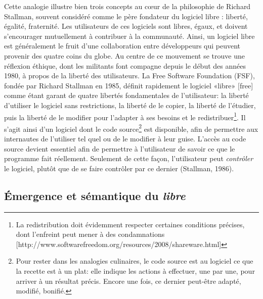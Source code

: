 \documentclass[
  letterpaper,
  DIV=11,
  numbers=noendperiod]{scrreprt}
\begin{document}
Cette analogie illustre bien trois concepts au cœur de la philosophie de
Richard Stallman, souvent considéré comme le père fondateur du logiciel
libre : liberté, égalité, fraternité. Les utilisateurs de ces logiciels
sont libres, égaux, et doivent s'encourager mutuellement à contribuer à
la communauté. Ainsi, un logiciel libre est généralement le fruit d'une
collaboration entre développeurs qui peuvent provenir des quatre coins
du globe. Au centre de ce mouvement se trouve une réflexion éthique,
dont les militants font compagne depuis le début des années 1980, à
propos de la liberté des utilisateurs. La Free Software Foundation
(FSF), fondée par Richard Stallman en 1985, définit rapidement le
logiciel «libre» {[}free{]} comme étant garant de quatre libertés
fondamentales de l'utilisateur: la liberté d'utiliser le logiciel sans
restrictions, la liberté de le copier, la liberté de l'étudier, puis la
liberté de le modifier pour l'adapter à ses besoins et le
redistribuer\footnote{La redistribution doit évidemment respecter
  certaines conditions précises, dont l'enfreint peut mener à des
  condamnations
  {[}http://www.softwarefreedom.org/resources/2008/shareware.html{]}}.
Il s'agit ainsi d'un logiciel dont le code source\footnote{Pour rester
  dans les analogies culinaires, le code source est au logiciel ce que
  la recette est à un plat: elle indique les actions à effectuer, une
  par une, pour arriver à un résultat précis. Encore une fois, ce
  dernier peut-être adapté, modifié, bonifié.} est disponible, afin de
permettre aux internautes de l'utiliser tel quel ou de le modifier à
leur guise. L'accès au code source devient essentiel afin de permettre à
l'utilisateur de savoir ce que le programme fait réellement. Seulement
de cette façon, l'utilisateur peut \emph{contrôler} le logiciel, plutôt
que de se faire contrôler par ce dernier (Stallman, 1986).

\hypertarget{uxe9mergence-et-suxe9mantique-du-libre}{%
\subsection{\texorpdfstring{Émergence et sémantique du
\emph{libre}}{Émergence et sémantique du libre}}\label{uxe9mergence-et-suxe9mantique-du-libre}}
\end{document}
